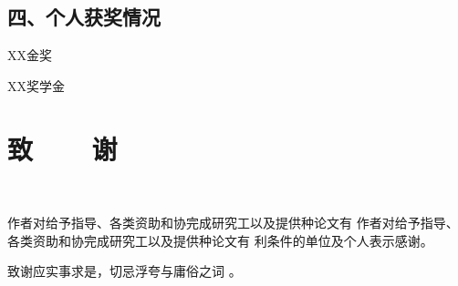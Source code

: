 \vspace{22pt}
\subsection*{四、个人获奖情况}
\begin{enumerate}[label={[\arabic*]},itemindent=2em,wide]
	\item XX金奖
	\item XX奖学金
\end{enumerate}
\fi

\newpage

\ifblindreview
\else

\section{{致~~~~谢}} %
\renewcommand*{\baselinestretch}{1.0} %
\setlength{\baselineskip}{20pt} %
{~}
\vspace{-9pt}

作者对给予指导、各类资助和协完成研究工以及提供种论文有 作者对给予指导、各类资助和协完成研究工以及提供种论文有 利条件的单位及个人表示感谢。

致谢应实事求是，切忌浮夸与庸俗之词 。

\newpage
\fi